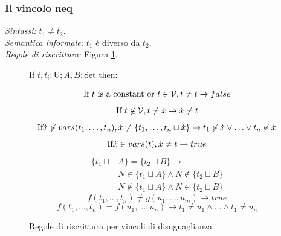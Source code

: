 \documentclass[12pt,a4paper,openright]{book} %
\begin{document}
\subsubsection{Il vincolo neq}

\textit{Sintassi:} $t_1 \neq t_2$.\\
\noindent\textit{Semantica informale:} $t_1$ è diverso da $t_2$.\\
\noindent\textit{Regole di riscrittura:} Figura \ref{fig:neq_constraints}.

\begin{figure}
	\begin{tcolorbox}[colframe=black, colback=white, sharp corners]
		\setcounter{equation}{0}
		\renewcommand{\theequation}{$\neq$\textsubscript{\arabic{equation}}}

		If $t, t_i: \text{U}; A,B: \text{Set}$ then:

		\begin{equation}
		\text{If } t \text{ is a constant or } t \in \mathcal{V}, t \neq t \to false
		\end{equation}
		\begin{equation}
		\text{If } t \not\in \mathcal{V}, t \neq \dot{x} \to \dot{x} \neq t
		\end{equation}
		\begin{equation}
		\text{If} \dot{x} \not\in vars(t_1, \ldots, t_n), \dot{x} \neq \{ t_1, \ldots, t_n \sqcup \dot{x} \} \to t_1 \not\in \dot{x} \lor \ldots \lor t_n \not\in \dot{x}
		\end{equation}
		\begin{equation}
		\text{If} \dot{x} \in vars(t), \dot{x} \neq t \to true
		\end{equation}
		\begin{equation}
		\begin{split}
		\{ t_1 \sqcup & A \} = \{ t_2 \sqcup B \} \to \\
		& N \in \{ t_1 \sqcup A \} \land N \not\in \{ t_2 \sqcup B \} \\
		& N \not\in \{ t_1 \sqcup A \} \land N \in \{ t_2 \sqcup B \}
		\end{split}
		\end{equation}
		\begin{equation}
		f(t_1, \ldots, t_n) \neq g(u_1, \ldots, u_m) \to true
		\end{equation}
		\begin{equation}
		f(t_1, \ldots, t_n) = f(u_1, \ldots, u_n) \to t_1 \neq u_1 \land \ldots \land t_1 \neq u_n
		\end{equation}

	\end{tcolorbox}

	\caption{Regole di riscrittura per vincoli di disuguaglianza}
	\label{fig:neq_constraints}
\end{figure}
\end{document}
